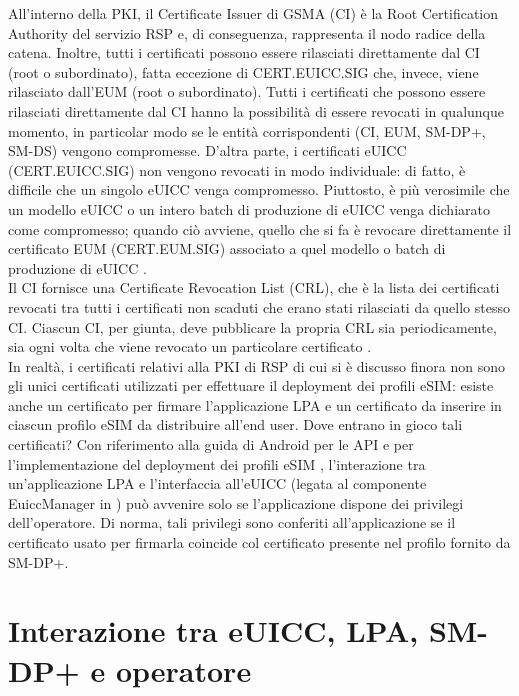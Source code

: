 \documentclass[10pt, twoside, openany]{book}
\begin{document}
All'interno della PKI, il Certificate Issuer di GSMA (CI) è la Root Certification Authority del servizio RSP e, di conseguenza, rappresenta il nodo radice della catena. Inoltre, tutti i certificati possono essere rilasciati direttamente dal CI (root o subordinato), fatta eccezione di CERT.EUICC.SIG che, invece, viene rilasciato dall'EUM (root o subordinato). Tutti i certificati che possono essere rilasciati direttamente dal CI hanno la possibilità di essere revocati in qualunque momento, in particolar modo se le entità corrispondenti (CI, EUM, SM-DP+, SM-DS) vengono compromesse. D'altra parte, i certificati eUICC (CERT.EUICC.SIG) non vengono revocati in modo individuale: di fatto, è difficile che un singolo eUICC venga compromesso. Piuttosto, è più verosimile che un modello eUICC o un intero batch di produzione di eUICC venga dichiarato come compromesso; quando ciò avviene, quello che si fa è revocare direttamente il certificato EUM (CERT.EUM.SIG) associato a quel modello o batch di produzione di eUICC \cite{GSMA-docs-new}.\\
Il CI fornisce una Certificate Revocation List (CRL), che è la lista dei certificati revocati tra tutti i certificati non scaduti che erano stati rilasciati da quello stesso CI. Ciascun CI, per giunta, deve pubblicare la propria CRL sia periodicamente, sia ogni volta che viene revocato un particolare certificato \cite{GSMA-docs-new}.\\
In realtà, i certificati relativi alla PKI di RSP di cui si è discusso finora non sono gli unici certificati utilizzati per effettuare il deployment dei profili eSIM: esiste anche un certificato per firmare l'applicazione LPA e un certificato da inserire in ciascun profilo eSIM da distribuire all'end user. Dove entrano in gioco tali certificati? Con riferimento alla guida di Android per le API e per l'implementazione del deployment dei profili eSIM \cite{Android-docs}, l'interazione tra un'applicazione LPA e l'interfaccia all'eUICC (legata al componente EuiccManager in \cite{Android-docs}) può avvenire solo se l'applicazione dispone dei privilegi dell'operatore. Di norma, tali privilegi sono conferiti all'applicazione se il certificato usato per firmarla coincide col certificato presente nel profilo fornito da SM-DP+.

\section{Interazione tra eUICC, LPA, SM-DP+ e operatore}
\end{document}
